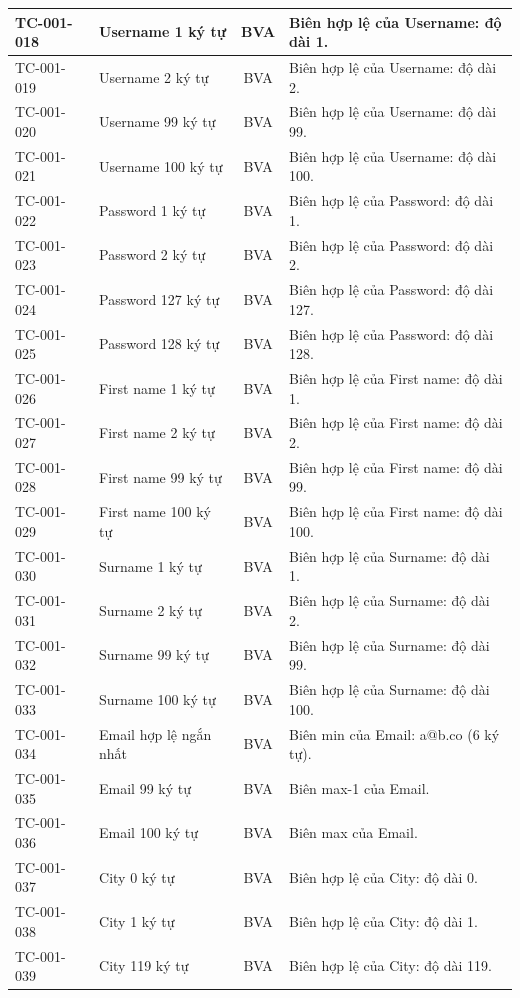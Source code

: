 {\begin{longtable}{|l|L{4.4cm}|c|L{6.4cm}|}
TC-001-018 & Username 1 ký tự & BVA & Biên hợp lệ của Username: độ dài 1. \\ \hline
TC-001-019 & Username 2 ký tự & BVA & Biên hợp lệ của Username: độ dài 2. \\ \hline
TC-001-020 & Username 99 ký tự & BVA & Biên hợp lệ của Username: độ dài 99. \\ \hline
TC-001-021 & Username 100 ký tự & BVA & Biên hợp lệ của Username: độ dài 100. \\ \hline
TC-001-022 & Password 1 ký tự & BVA & Biên hợp lệ của Password: độ dài 1. \\ \hline
TC-001-023 & Password 2 ký tự & BVA & Biên hợp lệ của Password: độ dài 2. \\ \hline
TC-001-024 & Password 127 ký tự & BVA & Biên hợp lệ của Password: độ dài 127. \\ \hline
TC-001-025 & Password 128 ký tự & BVA & Biên hợp lệ của Password: độ dài 128. \\ \hline
TC-001-026 & First name 1 ký tự & BVA & Biên hợp lệ của First name: độ dài 1. \\ \hline
TC-001-027 & First name 2 ký tự & BVA & Biên hợp lệ của First name: độ dài 2. \\ \hline
TC-001-028 & First name 99 ký tự & BVA & Biên hợp lệ của First name: độ dài 99. \\ \hline
TC-001-029 & First name 100 ký tự & BVA & Biên hợp lệ của First name: độ dài 100. \\ \hline
TC-001-030 & Surname 1 ký tự & BVA & Biên hợp lệ của Surname: độ dài 1. \\ \hline
TC-001-031 & Surname 2 ký tự & BVA & Biên hợp lệ của Surname: độ dài 2. \\ \hline
TC-001-032 & Surname 99 ký tự & BVA & Biên hợp lệ của Surname: độ dài 99. \\ \hline
TC-001-033 & Surname 100 ký tự & BVA & Biên hợp lệ của Surname: độ dài 100. \\ \hline
TC-001-034 & Email hợp lệ ngắn nhất & BVA & Biên min của Email: a@b.co (6 ký tự). \\ \hline
TC-001-035 & Email 99 ký tự & BVA & Biên max-1 của Email. \\ \hline
TC-001-036 & Email 100 ký tự & BVA & Biên max của Email. \\ \hline
TC-001-037 & City 0 ký tự & BVA & Biên hợp lệ của City: độ dài 0. \\ \hline
TC-001-038 & City 1 ký tự & BVA & Biên hợp lệ của City: độ dài 1. \\ \hline
TC-001-039 & City 119 ký tự & BVA & Biên hợp lệ của City: độ dài 119. \\ \hline

\end{longtable}}
